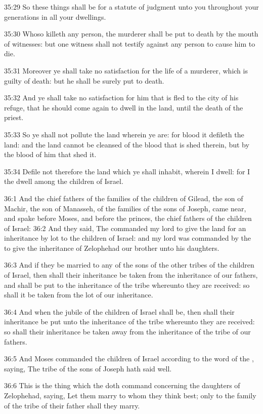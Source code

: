 35:29 So these things shall be for a statute of judgment unto you
throughout your generations in all your dwellings.

35:30 Whoso killeth any person, the murderer shall be put to death by
the mouth of witnesses: but one witness shall not testify against any
person to cause him to die.

35:31 Moreover ye shall take no satisfaction for the life of a
murderer, which is guilty of death: but he shall be surely put to
death.

35:32 And ye shall take no satisfaction for him that is fled to the
city of his refuge, that he should come again to dwell in the land,
until the death of the priest.

35:33 So ye shall not pollute the land wherein ye are: for blood it
defileth the land: and the land cannot be cleansed of the blood that
is shed therein, but by the blood of him that shed it.

35:34 Defile not therefore the land which ye shall inhabit, wherein I
dwell: for I the \LORD dwell among the children of Israel.

36:1 And the chief fathers of the families of the children of Gilead,
the son of Machir, the son of Manasseh, of the families of the sons of
Joseph, came near, and spake before Moses, and before the princes, the
chief fathers of the children of Israel: 36:2 And they said, The \LORD
commanded my lord to give the land for an inheritance by lot to the
children of Israel: and my lord was commanded by the \LORD to give the
inheritance of Zelophehad our brother unto his daughters.

36:3 And if they be married to any of the sons of the other tribes of
the children of Israel, then shall their inheritance be taken from the
inheritance of our fathers, and shall be put to the inheritance of the
tribe whereunto they are received: so shall it be taken from the lot
of our inheritance.

36:4 And when the jubile of the children of Israel shall be, then
shall their inheritance be put unto the inheritance of the tribe
whereunto they are received: so shall their inheritance be taken away
from the inheritance of the tribe of our fathers.

36:5 And Moses commanded the children of Israel according to the word
of the \LORD, saying, The tribe of the sons of Joseph hath said well.

36:6 This is the thing which the \LORD doth command concerning the
daughters of Zelophehad, saying, Let them marry to whom they think
best; only to the family of the tribe of their father shall they
marry.

